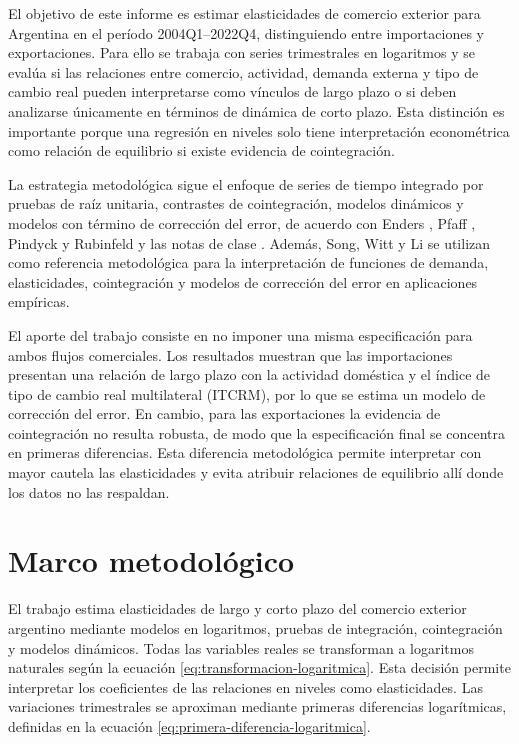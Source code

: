 \documentclass[11pt]{article}
\begin{document}
El objetivo de este informe es estimar elasticidades de comercio exterior para
Argentina en el período 2004Q1--2022Q4, distinguiendo entre importaciones y
exportaciones. Para ello se trabaja con series trimestrales en logaritmos y se
evalúa si las relaciones entre comercio, actividad, demanda externa y tipo de
cambio real pueden interpretarse como vínculos de largo plazo o si deben
analizarse únicamente en términos de dinámica de corto plazo. Esta distinción es
importante porque una regresión en niveles solo tiene interpretación
econométrica como relación de equilibrio si existe evidencia de cointegración.

La estrategia metodológica sigue el enfoque de series de tiempo integrado por
pruebas de raíz unitaria, contrastes de cointegración, modelos dinámicos y
modelos con término de corrección del error, de acuerdo con Enders
\cite{enders_2014}, Pfaff \cite{pfaff_2008}, Pindyck y Rubinfeld
\cite{pindyck_rubinfeld_1998} y las notas de clase \cite{fabris_2025}. Además,
Song, Witt y Li \cite{song_witt_li_2008} se utilizan como referencia
metodológica para la interpretación de funciones de demanda, elasticidades,
cointegración y modelos de corrección del error en aplicaciones empíricas.

El aporte del trabajo consiste en no imponer una misma especificación para ambos
flujos comerciales. Los resultados muestran que las importaciones presentan una
relación de largo plazo con la actividad doméstica y el índice de tipo de cambio
real multilateral (ITCRM), por lo que se estima un modelo de corrección del
error. En cambio, para las exportaciones la
evidencia de cointegración no resulta robusta, de modo que la especificación
final se concentra en primeras diferencias. Esta diferencia metodológica permite
interpretar con mayor cautela las elasticidades y evita atribuir relaciones de
equilibrio allí donde los datos no las respaldan.



\section{Marco metodológico}
\label{sec:marco-metodologico}

El trabajo estima elasticidades de largo y corto plazo del comercio exterior
argentino mediante modelos en logaritmos, pruebas de integración,
cointegración y modelos dinámicos. Todas las variables reales se transforman a
logaritmos naturales según la ecuación \eqref{eq:transformacion-logaritmica}.
Esta decisión permite interpretar los coeficientes de las relaciones en niveles
como elasticidades. Las variaciones trimestrales se aproximan mediante primeras
diferencias logarítmicas, definidas en la ecuación
\eqref{eq:primera-diferencia-logaritmica}.
\end{document}
